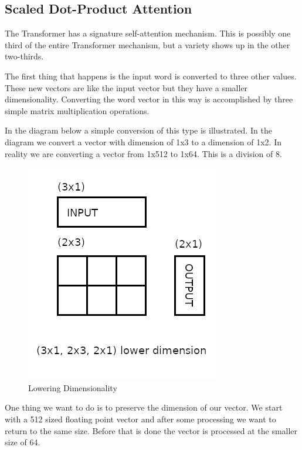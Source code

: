 \subsection*{Scaled Dot-Product Attention}

The Transformer has a signature self-attention mechanism. This is possibly one third of the entire Transformer mechanism, but a variety shows up in the other two-thirds. 

The first thing that happens is the input word is converted to three other values. These new vectors are like the input vector but they have a smaller dimensionality. Converting the word vector in this way is accomplished by three simple matrix multiplication operations.

In the diagram below a simple conversion of this type is illustrated. In the diagram we convert a vector with dimension of 1x3 to a dimension of 1x2. In reality we are converting a vector from 1x512 to 1x64. This is a division of 8.



\begin{figure}[H]
	\begin{center}
		
	
	\includegraphics[scale=0.5]{diagram-mat01}
\end{center}
	\caption[Lowering Dimensionality]{Lowering Dimensionality}
	
\end{figure}


One thing we want to do is to preserve the dimension of our vector. We start with a 512 sized floating point vector and after some processing we want to return to the same size. Before that is done the vector is processed at the smaller size of 64. 

